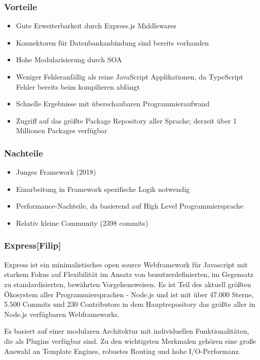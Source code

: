 \subsubsection*{Vorteile}
\begin{itemize}
    \item Gute Erweiterbarkeit durch Express.js Middlewares
    \item Konnektoren für Datenbankanbindung sind bereits vorhanden
    \item Hohe Modularisierung durch SOA
    \item Weniger Fehleranfällig als reine JavaScript Applikationen, da TypeScript Fehler bereits beim kompilieren abfängt
    \item Schnelle Ergebnisse mit überschaubaren Programmieraufwand
    \item Zugriff auf das größte Package Repository aller Sprache; derzeit über 1 Millionen Packages verfügbar
\end{itemize}

\subsubsection*{Nachteile}
\begin{itemize}
    \item Junges Framework (2018)
    \item Einarbeitung in Framework spezifische Logik notwendig
    \item Performance-Nachteile, da basierend auf High Level Programmiersprache
    \item Relativ kleine Community (2398 commits)
\end{itemize}

\subsubsection*{Express\hfill[Filip]}
Express ist ein minimalistisches open source Webframework für Javascript mit starkem Fokus auf Flexibilität im Ansatz von benutzerdefinierten, im Gegensatz zu standardisierten, bewährten Vorgehensweisen. Es ist Teil des aktuell größten Ökosystem aller Programmiersprachen - Node.js und ist mit über 47.000 Sterne, 5.500 Commits und 230 Contributors in dem Hauptrepository das größte aller in Node.js verfügbaren Webframeworks.

Es basiert auf einer modularen Architektur mit individuellen Funktionalitäten, die als Plugins verfügbar sind. Zu den wichtigsten Merkmalen gehören eine große Auswahl an Template Engines, robustes Routing und hohe I/O-Performanz.

